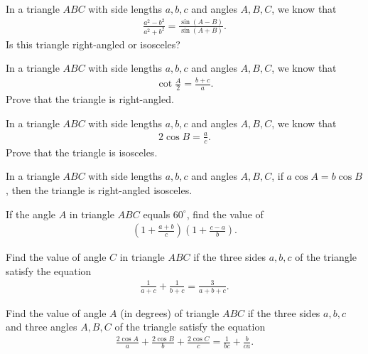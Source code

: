 \begin{question}
    In a triangle $ABC$ with side lengths $a,b,c$ and angles $A,B,C$, we know that
    \begin{align*}
        \frac{a^2-b^2}{a^2+b^2} = \frac{\sin(A-B)}{\sin(A+B)}.
    \end{align*}
    Is this triangle right-angled or isosceles?
\end{question}

\begin{question}
    In a triangle $ABC$ with side lengths $a,b,c$ and angles $A,B,C$, we know that
    \begin{align*}
        \cot \frac{A}{2}= \frac{b+c}{a}.
    \end{align*}
    Prove that the triangle is right-angled.
\end{question}


\begin{question}
    In a triangle $ABC$ with side lengths $a,b,c$ and angles $A,B,C$, we know that
    \begin{align*}
        2\cos B= \frac{a}{c}.
    \end{align*}
    Prove that the triangle is isosceles.
\end{question}


\begin{question}
    In a triangle $ABC$ with side lengths $a,b,c$ and angles $A,B,C$, if $a\cos A = b \cos B$, then the triangle is right-angled isosceles.
\end{question}

\begin{question}
    If the angle $A$ in triangle $ABC$ equals $60^\circ$, find the value of
    \begin{align*}
        \left(1+\frac{a+b}{c}\right)\left(1+\frac{c-a}{b}\right).
    \end{align*}
\end{question}


\begin{question}
    Find the value of angle $C$ in triangle $ABC$ if the three sides $a,b,c$ of the triangle satisfy the equation
    \begin{align*}
        \frac{1}{a+c}+\frac{1}{b+c}=\frac{3}{a+b+c}.
    \end{align*}
\end{question}



\begin{question}
    Find the value of angle $A$ (in degrees) of triangle $ABC$ if the three sides $a,b,c$ and three angles $A,B,C$ of the triangle satisfy the equation
    \begin{align*}
        \frac{2\cos A}{a}+\frac{2\cos B}{b}+\frac{2\cos C}{c}=\frac{1}{bc}+\frac{b}{ca}.
    \end{align*}
\end{question}


